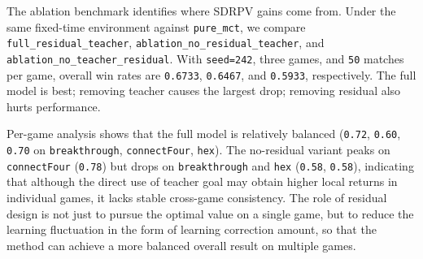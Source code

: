 The ablation benchmark identifies where SDRPV gains come from. Under the same fixed-time environment against \texttt{pure_mct}, we compare \texttt{full_residual_teacher}, \texttt{ablation_no_residual_teacher}, and \texttt{ablation_no_teacher_residual}. With \texttt{seed=242}, three games, and \texttt{50} matches per game, overall win rates are \texttt{0.6733}, \texttt{0.6467}, and \texttt{0.5933}, respectively. The full model is best; removing teacher causes the largest drop; removing residual also hurts performance.


Per-game analysis shows that the full model is relatively balanced (\texttt{0.72}, \texttt{0.60}, \texttt{0.70} on \texttt{breakthrough}, \texttt{connectFour}, \texttt{hex}). The no-residual variant peaks on \texttt{connectFour} (\texttt{0.78}) but drops on \texttt{breakthrough} and \texttt{hex} (\texttt{0.58}, \texttt{0.58}), indicating that although the direct use of teacher goal may obtain higher local returns in individual games, it lacks stable cross-game consistency. The role of residual design is not just to pursue the optimal value on a single game, but to reduce the learning fluctuation in the form of learning correction amount, so that the method can achieve a more balanced overall result on multiple games.


